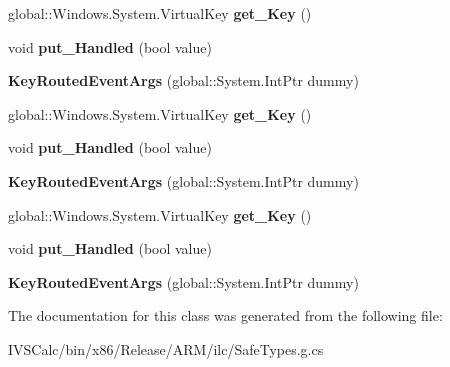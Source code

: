 \begin{DoxyCompactItemize}
global\+::\+Windows.\+System.\+Virtual\+Key {\bfseries get\+\_\+\+Key} ()
\item 
\mbox{\label{class_windows_1_1_u_i_1_1_xaml_1_1_input_1_1_key_routed_event_args_ad9a300c74887a3ea1d12bae8837d6cc1}} 
void {\bfseries put\+\_\+\+Handled} (bool value)
\item 
\mbox{\label{class_windows_1_1_u_i_1_1_xaml_1_1_input_1_1_key_routed_event_args_abc0304a76e6845c6d5507244b15c37d5}} 
{\bfseries Key\+Routed\+Event\+Args} (global\+::\+System.\+Int\+Ptr dummy)
\item 
\mbox{\label{class_windows_1_1_u_i_1_1_xaml_1_1_input_1_1_key_routed_event_args_adecef562a54458b9bb45e8ff94ab068a}} 
global\+::\+Windows.\+System.\+Virtual\+Key {\bfseries get\+\_\+\+Key} ()
\item 
\mbox{\label{class_windows_1_1_u_i_1_1_xaml_1_1_input_1_1_key_routed_event_args_ad9a300c74887a3ea1d12bae8837d6cc1}} 
void {\bfseries put\+\_\+\+Handled} (bool value)
\item 
\mbox{\label{class_windows_1_1_u_i_1_1_xaml_1_1_input_1_1_key_routed_event_args_abc0304a76e6845c6d5507244b15c37d5}} 
{\bfseries Key\+Routed\+Event\+Args} (global\+::\+System.\+Int\+Ptr dummy)
\item 
\mbox{\label{class_windows_1_1_u_i_1_1_xaml_1_1_input_1_1_key_routed_event_args_adecef562a54458b9bb45e8ff94ab068a}} 
global\+::\+Windows.\+System.\+Virtual\+Key {\bfseries get\+\_\+\+Key} ()
\item 
\mbox{\label{class_windows_1_1_u_i_1_1_xaml_1_1_input_1_1_key_routed_event_args_ad9a300c74887a3ea1d12bae8837d6cc1}} 
void {\bfseries put\+\_\+\+Handled} (bool value)
\item 
\mbox{\label{class_windows_1_1_u_i_1_1_xaml_1_1_input_1_1_key_routed_event_args_abc0304a76e6845c6d5507244b15c37d5}} 
{\bfseries Key\+Routed\+Event\+Args} (global\+::\+System.\+Int\+Ptr dummy)
\end{DoxyCompactItemize}


The documentation for this class was generated from the following file\+:\begin{DoxyCompactItemize}
\item 
I\+V\+S\+Calc/bin/x86/\+Release/\+A\+R\+M/ilc/Safe\+Types.\+g.\+cs\end{DoxyCompactItemize}
